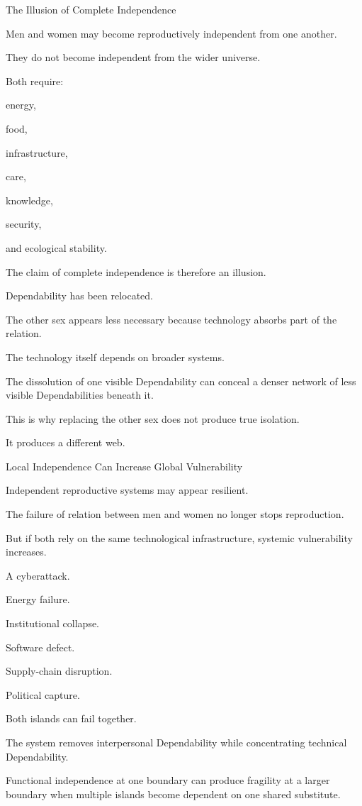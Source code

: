 The Illusion of Complete Independence

Men and women may become reproductively independent from one another.

They do not become independent from the wider universe.

Both require:

energy,

food,

infrastructure,

care,

knowledge,

security,

and ecological stability.

The claim of complete independence is therefore an illusion.

Dependability has been relocated.

The other sex appears less necessary because technology absorbs part of the relation.

The technology itself depends on broader systems.

The dissolution of one visible Dependability can conceal a denser network of less visible Dependabilities beneath it.

This is why replacing the other sex does not produce true isolation.

It produces a different web.

Local Independence Can Increase Global Vulnerability

Independent reproductive systems may appear resilient.

The failure of relation between men and women no longer stops reproduction.

But if both rely on the same technological infrastructure, systemic vulnerability increases.

A cyberattack.

Energy failure.

Institutional collapse.

Software defect.

Supply-chain disruption.

Political capture.

Both islands can fail together.

The system removes interpersonal Dependability while concentrating technical Dependability.

Functional independence at one boundary can produce fragility at a larger boundary when multiple islands become dependent on one shared substitute.

